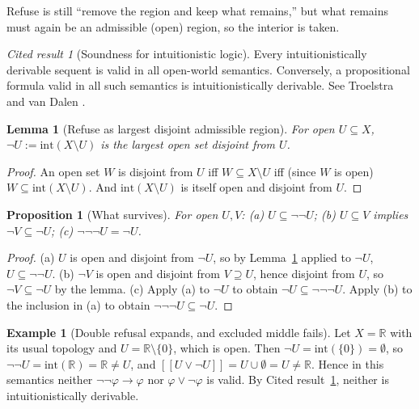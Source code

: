 \documentclass[11pt]{article}
\newcommand{\sem}[1]{[\![#1]\!]}
\theoremstyle{definition}
\newtheorem{example}[definition]{Example}
\theoremstyle{plain}
\newtheorem{proposition}[definition]{Proposition}
\newtheorem{lemma}[definition]{Lemma}
\theoremstyle{remark}
\newtheorem{cited}[definition]{Cited result}
\begin{document}
Refuse is still ``remove the region and keep what remains,'' but what remains must again be an admissible (open) region, so the interior is taken.

\begin{cited}[Soundness for intuitionistic logic]\label{cit:heyting}
Every intuitionistically derivable sequent is valid in all open-world semantics. Conversely, a propositional formula valid in all such semantics is intuitionistically derivable. See Troelstra and van Dalen \cite[Ch.~2]{TvD88}.
\end{cited}

\begin{lemma}[Refuse as largest disjoint admissible region]\label{lem:largest}
For open $U\subseteq X$, $\neg U:=\mathrm{int}(X\setminus U)$ is the largest open set disjoint from $U$.
\end{lemma}
\begin{proof}
An open set $W$ is disjoint from $U$ iff $W\subseteq X\setminus U$ iff (since $W$ is open) $W\subseteq\mathrm{int}(X\setminus U)$. And $\mathrm{int}(X\setminus U)$ is itself open and disjoint from $U$.
\end{proof}

\begin{proposition}[What survives]\label{prop:survive}
For open $U,V$: (a) $U\subseteq\neg\neg U$; (b) $U\subseteq V$ implies $\neg V\subseteq\neg U$; (c) $\neg\neg\neg U=\neg U$.
\end{proposition}
\begin{proof}
(a) $U$ is open and disjoint from $\neg U$, so by Lemma~\ref{lem:largest} applied to $\neg U$, $U\subseteq\neg\neg U$. (b) $\neg V$ is open and disjoint from $V\supseteq U$, hence disjoint from $U$, so $\neg V\subseteq\neg U$ by the lemma. (c) Apply (a) to $\neg U$ to obtain $\neg U\subseteq\neg\neg\neg U$. Apply (b) to the inclusion in (a) to obtain $\neg\neg\neg U\subseteq\neg U$.
\end{proof}

\begin{example}[Double refusal expands, and excluded middle fails]\label{ex:heyting}
Let $X=\mathbb{R}$ with its usual topology and $U=\mathbb{R}\setminus\{0\}$, which is open. Then $\neg U=\mathrm{int}(\{0\})=\emptyset$, so $\neg\neg U=\mathrm{int}(\mathbb{R})=\mathbb{R}\neq U$, and $\sem{U\vee\neg U}=U\cup\emptyset=U\neq\mathbb{R}$. Hence in this semantics neither $\neg\neg\varphi\to\varphi$ nor $\varphi\vee\neg\varphi$ is valid. By Cited result~\ref{cit:heyting}, neither is intuitionistically derivable.
\end{example}
\end{document}
